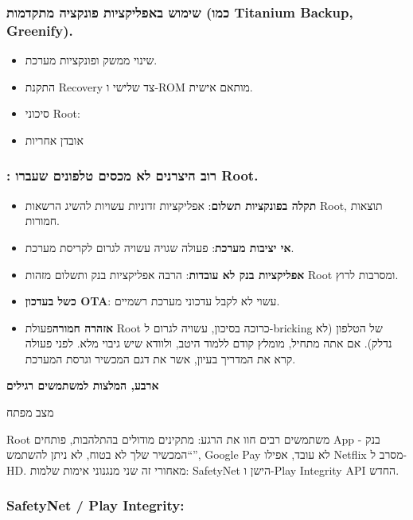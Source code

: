 \subsubsection*{שימוש באפליקציות פונקציה מתקדמות (כמו Titanium Backup, Greenify).}

\begin{itemize}
  \item שינוי ממשק ופונקציות מערכת.
  \item התקנת Recovery צד שלישי ו-ROM מותאם אישית.
  \item סיכוני Root:
  \item אובדן אחריות
\end{itemize}

\subsubsection*{: רוב היצרנים לא מכסים טלפונים שעברו Root.}

\begin{itemize}
  \item \textbf{תקלה בפונקציות תשלום}: אפליקציות זדוניות עשויות להשיג הרשאות Root, תוצאות חמורות.
  \item \textbf{אי יציבות מערכת}: פעולה שגויה עשויה לגרום לקריסת מערכת.
  \item \textbf{אפליקציות בנק לא עובדות}: הרבה אפליקציות בנק ותשלום מזהות Root ומסרבות לרוץ.
  \item \textbf{כשל בעדכון OTA}: עשוי לא לקבל עדכוני מערכת רשמיים.
  \item \textbf{אזהרה חמורה}פעולת Root כרוכה בסיכון, עשויה לגרום ל-bricking של הטלפון (לא נדלק). אם אתה מתחיל, מומלץ קודם ללמוד היטב, ולוודא שיש גיבוי מלא. לפני פעולה קרא את המדריך בעיון, אשר את דגם המכשיר וגרסת המערכת.
\end{itemize}

\textbf{ארבע, המלצות למשתמשים רגילים}\par

מצב מפתח


Root משתמשים רבים חוו את הרגע: מתקינים מודולים בהתלהבות, פותחים App בנק - “המכשיר שלך לא בטוח, לא ניתן להשתמש”, Google Pay לא עובד, אפילו Netflix מסרב ל-HD. מאחורי זה שני מנגנוני אימות שלמות: SafetyNet הישן ו-Play Integrity API החדש.

\subsubsection*{SafetyNet / Play Integrity:}

